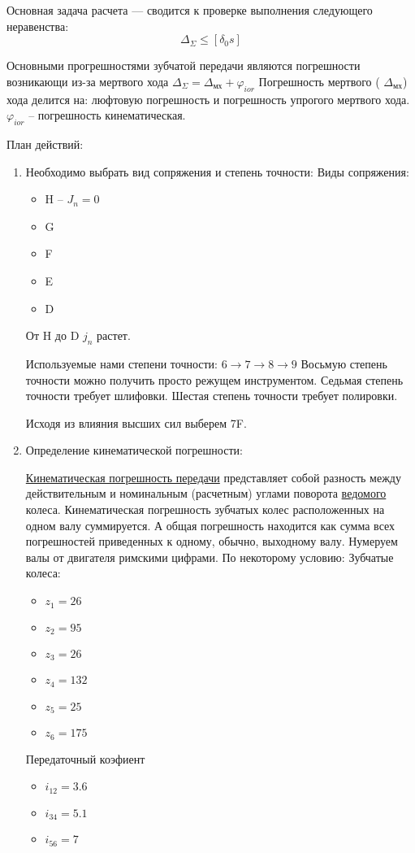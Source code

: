 \documentclass{article}
\begin{document}
Основная задача расчета --- сводится к проверке выполнения следующего неравенства:
$$
\Delta_{\Sigma} \le [ \delta_0 s]
$$

Основными прогрешностями зубчатой передачи являются погрешности возникающи из-за мертвого хода $ \Delta_{\Sigma} = \Delta_{мх} + \varphi_{ior}$ Погрешность мертвого ( $ \Delta_{мх}$) хода делится на: люфтовую погрешность и погрешность упрогого мертвого хода. $\varphi_{ior}$ -- погрешность кинематическая.

План действий:
\begin{enumerate}
	\item Необходимо выбрать вид сопряжения и степень точности:
	Виды сопряжения:
	\begin{itemize}
		\item H -- $J_n = 0$
		\item G
		\item F
		\item E
		\item D
	\end{itemize}
	От H до D $j_n$ растет.

	Используемые нами степени точности:
	$6 \to 7 \to 8 \to 9$
	Восьмую степень точности можно получить просто режущем инструментом. Седьмая степень точности требует шлифовки. Шестая степень точности требует полировки.

	Исходя из влияния высших сил выберем 7F.
	\item Определение кинематической погрешности:

	\underline{Кинематическая погрешность передачи} представляет собой разность между действительным и номинальным (расчетным) углами поворота \underline{ведомого} колеса. Кинематическая погрешность зубчатых колес расположенных на одном валу суммируется. А общая погрешность находится как сумма всех погрешностей приведенных к одному, обычно, выходному валу.
	Нумеруем валы от двигателя римскими цифрами.
	По некоторому условию:
	Зубчатые колеса:
	\begin{itemize}
		\item $z_1 = 26$
		\item $z_2 = 95$
		\item $z_3 = 26$
		\item $z_4 = 132$
		\item $z_5 = 25$
		\item $z_6 = 175$
	\end{itemize}
	Передаточный коэфиент
	\begin{itemize}
		\item $i_{12} = 3.6$
		\item $i_{34} = 5.1$
		\item $i_{56} = 7$
	\end{itemize}
	

\end{enumerate}
\end{document}
